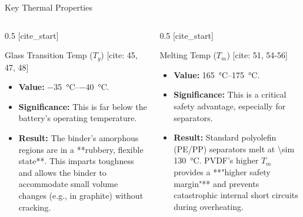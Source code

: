 \documentclass[aspectratio=169]{beamer}
\begin{document}
\begin{frame}{Key Thermal Properties}
    \begin{columns}[T]
        \begin{column}{0.5\textwidth}
            [cite_start]\begin{block}{Glass Transition Temp ($T_g$) [cite: 45, 47, 48]}
                \begin{itemize}
                    \item \textbf{Value:} \SIrange{-35}{-40}{\celsius}.
                    \item \textbf{Significance:} This is far below the battery's operating temperature.
                    \item \textbf{Result:} The binder's amorphous regions are in a **rubbery, flexible state**. This imparts toughness and allows the binder to accommodate small volume changes (e.g., in graphite) without cracking.
                \end{itemize}
            \end{block}
        \end{column}
        
        \begin{column}{0.5\textwidth}
            [cite_start]\begin{alertblock}{Melting Temp ($T_m$) [cite: 51, 54-56]}
                \begin{itemize}
                    \item \textbf{Value:} \SIrange{165}{175}{\celsius}.
                    \item \textbf{Significance:} This is a critical safety advantage, especially for separators.
                    \item \textbf{Result:} Standard polyolefin (PE/PP) separators melt at \SI{\sim 130}{\celsius}. PVDF's higher $T_m$ provides a **"higher safety margin"** and prevents catastrophic internal short circuits during overheating.
                \end{itemize}
            \end{alertblock}
        \end{column}
    \end{columns}
\end{frame}
\end{document}
